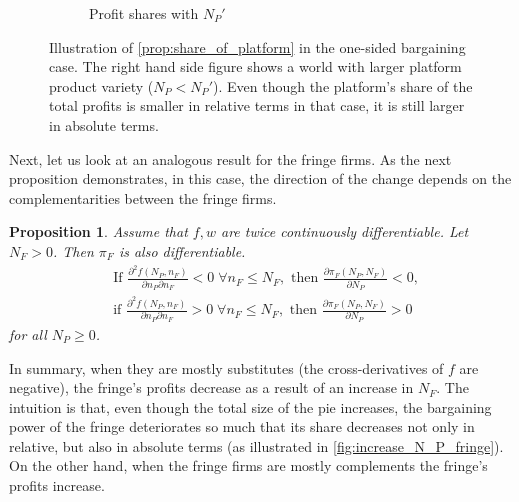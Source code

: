 \documentclass[a4paper]{article}
\newtheorem{proposition}{Proposition}
\begin{document}
\begin{figure}[ht]
\begin{subfigure}[b]{0.45\textwidth}
        \caption{Profit shares with $N_P'$}
    \end{subfigure}
    \caption{Illustration of \cref{prop:share_of_platform} in the one-sided bargaining case. The right hand side figure shows a world with larger platform product variety ($N_P < N_P'$). Even though the platform's share of the total profits is smaller in relative terms in that case, it is still larger in absolute terms.}
    \label{fig:increase_N_P_platform}
\end{figure}

Next, let us look at an analogous result for the fringe firms.
As the next proposition demonstrates, in this case, the direction of the change depends on the complementarities between the fringe firms.
\begin{proposition}
    \label{prop:share_of_fringe}
    Assume that $f, w$ are twice continuously differentiable.
    Let $N_F > 0$.
    Then $\pi_F$ is also differentiable.
    \begin{align*}
        &\text{If } \frac{\partial^2 f(N_P, n_F)}{\partial n_P \partial n_F} < 0 \;\forall n_F \leq N_F, \text{ then } \frac{\partial \pi_F(N_P, N_F)}{\partial N_P} < 0, \\
        &\text{if } \frac{\partial^2 f(N_P, n_F)}{\partial n_P \partial n_F} > 0 \;\forall n_F \leq N_F, \text{ then } \frac{\partial \pi_F(N_P, N_F)}{\partial N_P} > 0
    \end{align*}
    for all $N_P \geq 0$.
\end{proposition}
In summary, when they are mostly substitutes (the cross-derivatives of $f$ are negative), the fringe's profits decrease as a result of an increase in $N_F$.
The intuition is that, even though the total size of the pie increases, the bargaining power of the fringe deteriorates so much that its share decreases not only in relative, but also in absolute terms (as illustrated in \cref{fig:increase_N_P_fringe}).
On the other hand, when the fringe firms are mostly complements the fringe's profits increase.
\end{document}
